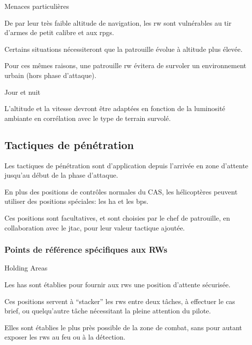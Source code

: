 	\item Menaces particulières

	\e
	    \item De par leur très faible altitude de navigation, les \gls{rw} sont vulnérables au tir d'armes de petit calibre et aux \glspl{rpg}.
	    \item Certains situations nécessiteront que la patrouille évolue à altitude plus élevée.
	    \item Pour ces mêmes raisons, une patrouille \gls{rw} évitera de survoler un environnement urbain (hors phase d'attaque).
	\ed

	\item Jour et nuit

	\e
	    \item L'altitude et la vitesse devront être adaptées en fonction de la luminosité ambiante en corrélation avec le type de terrain survolé.
	\ed
\ed

\subsection{Tactiques de pénétration}

\e
    \item Les tactiques de pénétration sont d'application depuis l'arrivée en zone d'attente jusqu'au début de la phase d'attaque.
    \item En plus des positions de contrôles normales du CAS, les hélicoptères peuvent utiliser des positions spéciales: les \gls{ha} et les \glspl{bp}.
    \item Ces positions sont facultatives, et sont choisies par le chef de patrouille, en collaboration avec le \gls{jtac}, pour leur valeur tactique ajoutée.
\ed

\subsubsection{Points de référence spécifiques aux RWs}

\e
	\item Holding Areas

	\e
	    \item Les \glspl{ha} sont établies pour fournir aux \glspl{rw} une position d'attente sécurisée.
	    \item Ces positions servent à “stacker” les \glspl{rw} entre deux tâches, à effectuer le \gls{cas} brief, ou quelqu'autre tâche nécessitant la pleine attention du pilote.
	    \item Elles sont établies le plus près possible de la zone de combat, sans pour autant exposer les \glspl{rw} au feu ou à la détection.
	\ed

